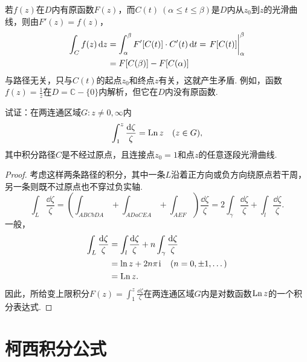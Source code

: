 若\(f(z)\)在\(D\)内有原函数\(F(z)\)，而\(C(t)\ (\alpha\leq t \leq\beta)\)是\(D\)内从\(z_0\)到\(z\)的光滑曲线，则由\(F'(z) = f(z)\)，\begin{align*}
\int_C f(z) \dd{z}
&= \int_\alpha^\beta F'[C(t)] \cdot C'(t) \dd{t}
= \eval{F[C(t)]}_\alpha^\beta \\
&= F[C(\beta)] - F[C(\alpha)]
\end{align*}
与路径无关，只与\(C(t)\)的起点\(z_0\)和终点\(z\)有关，这就产生矛盾.
例如，函数\(f(z) = \frac{1}{z}\)在\(D=\mathbb{C}-\{0\}\)内解析，但它在\(D\)内没有原函数.
\begin{example}%
\def\f{\frac{\dd{\zeta}}{\zeta}}
试证：在两连通区域\(G: z\neq0,\infty\)内\[
\int_1^z \f
= \Ln z
\quad (z \in G),
\]其中积分路径\(C\)是不经过原点，且连接点\(z_0=1\)和点\(z\)的任意逐段光滑曲线.
\begin{proof}
考虑这样两条路径的积分，其中一条\(L\)沿着正方向或负方向绕原点若干周，另一条则既不过原点也不穿过负实轴.
\[
\int_L \f
= \left(\int_{ABCbDA} + \int_{ADaCEA} + \int_{AEF}\right) \f
= 2 \int_{\gamma} \f + \int_l \f.
\]
一般，\begin{align*}
\int_L \f
&= \int_l \f + n \int_{\gamma} \f \\
&= \ln z + 2n\pi\iu \quad(n=0,\pm1,\dotsc) \\
&= \Ln z.
\end{align*}
因此，所给变上限积分\(F(z) = \int_1^z \f\)在两连通区域\(G\)内是对数函数\(\operatorname{Ln} z\)的一个积分表达式.
\end{proof}
\end{example}

\section{柯西积分公式}
